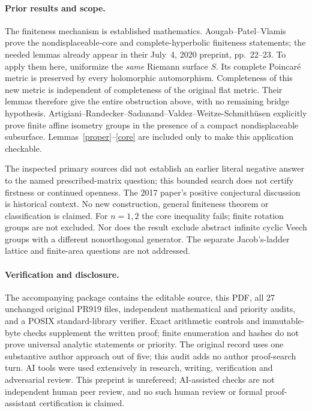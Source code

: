 \documentclass[11pt]{article}
\begin{document}
\paragraph{Prior results and scope.}
The finiteness mechanism is established mathematics. Aougab--Patel--Vlamis \cite[Lemmas~4.1--4.2]{APV} prove the nondisplaceable-core and complete-hyperbolic finiteness statements; the needed lemmas already appear in their July~4, 2020 preprint, pp.~22--23. To apply them here, uniformize the \emph{same} Riemann surface $S$. Its complete Poincar\'e metric is preserved by every holomorphic automorphism. Completeness of this new metric is independent of completeness of the original flat metric. Their lemmas therefore give the entire obstruction above, with no remaining bridge hypothesis. Artigiani--Randecker--Sadanand--Valdez--Weitze-Schmith\"usen \cite[v1, Theorem~1.6; v2, Theorem~1.8]{ARSVW} explicitly prove finite affine isometry groups in the presence of a compact nondisplaceable subsurface. Lemmas~\ref{proper}--\ref{core} are included only to make this application checkable.

The inspected primary sources did not establish an earlier literal negative answer to the named prescribed-matrix question; this bounded search does not certify firstness or continued openness. The 2017 paper's positive conjectural discussion \cite[p.~532]{RMV} is historical context. No new construction, general finiteness theorem or classification is claimed. For $n=1,2$ the core inequality fails; finite rotation groups are not excluded. Nor does the result exclude abstract infinite cyclic Veech groups with a different nonorthogonal generator. The separate Jacob's-ladder lattice and finite-area questions are not addressed.

\paragraph{Verification and disclosure.}
The accompanying package contains the editable source, this PDF, all 27 unchanged original PR919 files, independent mathematical and priority audits, and a POSIX standard-library verifier. Exact arithmetic controls and immutable-byte checks supplement the written proof; finite enumeration and hashes do not prove universal analytic statements or priority. The original record uses one substantive author approach out of five; this audit adds no author proof-search turn. AI tools were used extensively in research, writing, verification and adversarial review. This preprint is unrefereed; AI-assisted checks are not independent human peer review, and no such human review or formal proof-assistant certification is claimed.
\end{document}
